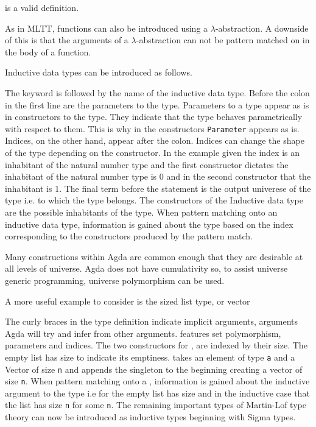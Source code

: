 is a valid definition.

As in MLTT, functions can also be introduced using a $\lambda$-abstraction. A
downside of this is that the arguments of a $\lambda$-abstraction can not be
pattern matched on in the body of a function.


Inductive data types can be introduced as follows.


The  keyword is followed by the name of the inductive data
type. Before the colon in the first line are the parameters to the type.
Parameters to a type appear as is in constructors to the type. They indicate
that the type behaves parametrically with respect to them. This is why in the
constructors \verb|Parameter| appears as is. Indices, on the other hand, appear
after the colon. Indices can change the shape of the type depending on the
constructor. In the example given the index is an inhabitant of the natural
number type and the first constructor dictates the inhabitant of the natural
number type is 0 and in the second constructor that the inhabitant is 1. The
final term before the  statement is the output univerese of
the type i.e. to which  the type belongs. The constructors of
the Inductive data type are the possible inhabitants of the type. When pattern
matching onto an inductive data type, information is gained about the type based
on the index corresponding to the constructors produced by the pattern match.

Many constructions within Agda are common enough that they are desirable at all
levels of universe. Agda does not have cumulativity so, to assist universe
generic programming, universe polymorphism can be used.

A more useful example to consider is the sized list type, or vector


The curly braces in the type definition indicate implicit arguments, arguments
Agda will try and infer from other arguments.  features set
polymorphism, parameters and indices. The two constructors for
, are indexed by their size. The empty list has size
 to indicate its emptiness.
takes an element of type \verb|a| and a Vector of size \verb|n| and appends the
singleton to the beginning creating a vector of size
 \verb|n|. When pattern matching onto a
, information is gained about the inductive argument to the
type i.e for the empty list has size  and in the
inductive case that the list has size  \verb|n|
for some \verb|n|. The remaining important types of Martin-Lof type theory can
now be introduced as inductive types beginning with Sigma types.

